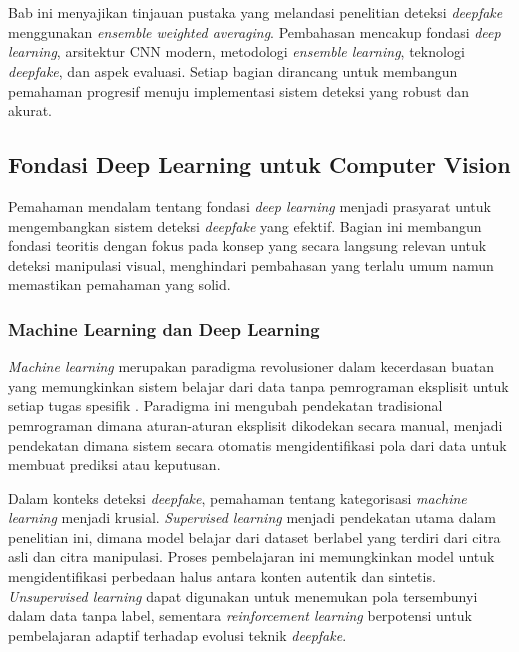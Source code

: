 \chapter{\babDua}

Bab ini menyajikan tinjauan pustaka yang melandasi penelitian deteksi \textit{deepfake} menggunakan \textit{ensemble weighted averaging}. Pembahasan mencakup fondasi \textit{deep learning}, arsitektur CNN modern, metodologi \textit{ensemble learning}, teknologi \textit{deepfake}, dan aspek evaluasi. Setiap bagian dirancang untuk membangun pemahaman progresif menuju implementasi sistem deteksi yang robust dan akurat.

\section{Fondasi Deep Learning untuk Computer Vision}

Pemahaman mendalam tentang fondasi \textit{deep learning} menjadi prasyarat untuk mengembangkan sistem deteksi \textit{deepfake} yang efektif. Bagian ini membangun fondasi teoritis dengan fokus pada konsep yang secara langsung relevan untuk deteksi manipulasi visual, menghindari pembahasan yang terlalu umum namun memastikan pemahaman yang solid.

\subsection{Machine Learning dan Deep Learning}

\textit{Machine learning} merupakan paradigma revolusioner dalam kecerdasan buatan yang memungkinkan sistem belajar dari data tanpa pemrograman eksplisit untuk setiap tugas spesifik \cite{mitchell1997machine}. Paradigma ini mengubah pendekatan tradisional pemrograman dimana aturan-aturan eksplisit dikodekan secara manual, menjadi pendekatan dimana sistem secara otomatis mengidentifikasi pola dari data untuk membuat prediksi atau keputusan.

Dalam konteks deteksi \textit{deepfake}, pemahaman tentang kategorisasi \textit{machine learning} menjadi krusial. \textit{Supervised learning} menjadi pendekatan utama dalam penelitian ini, dimana model belajar dari dataset berlabel yang terdiri dari citra asli dan citra manipulasi. Proses pembelajaran ini memungkinkan model untuk mengidentifikasi perbedaan halus antara konten autentik dan sintetis. \textit{Unsupervised learning} dapat digunakan untuk menemukan pola tersembunyi dalam data tanpa label, sementara \textit{reinforcement learning} berpotensi untuk pembelajaran adaptif terhadap evolusi teknik \textit{deepfake}.

